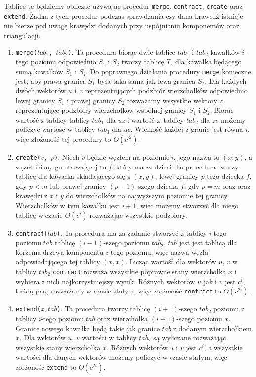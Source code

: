 \documentclass[twoside,a4paper,12pt]{report} %
\theoremstyle{break}
\begin{document}
Tablice te będziemy obliczać używając procedur \texttt{merge}, \texttt{contract}, \texttt{create} oraz \texttt{extend}. Żadna z tych procedur podczas sprawdzania czy dana krawędź istnieje nie bierze pod uwagę krawędzi dodanych przy uspójnianiu komponentów oraz triangulacji.
\begin{enumerate}
    \item \texttt{merge($tab_1$, $tab_2$)}. Ta procedura biorąc dwie tablice $tab_1$ i $tab_2$ kawałków $i$-tego poziomu odpowiednio $S_1$ i $S_2$ tworzy tablicę $T_3$ dla kawałka będącego sumą kawałków $S_1$ i $S_2$. Do poprawnego działania procedury \texttt{merge} konieczne jest, aby prawa granica $S_1$ była taka sama jak lewa granica $S_2$. Dla każdych dwóch wektorów $u$ i~$v$ reprezentujących podzbiór wierzchołków odpowiednio lewej granicy $S_1$ i prawej granicy $S_2$ rozważamy wszystkie wektory $z$ reprezentujące podzbiory wierzchołków wspólnej granicy $S_1$ i $S_2$. Biorąc wartość z tablicy tablicy $tab_1$ dla $uz$ i wartość z~tablicy $tab_2$ dla $zv$ możemy policzyć wartość w tablicy $tab_3$ dla $uv$. Wielkość każdej z granic jest równa $i$, więc złożoność tej procedury to $O(c^{3i})$.
    \item \texttt{create($v$, $p$)}. Niech $v$ będzie węzłem na poziomie $i$, jego nazwa to $(x,y)$, a węzeł ściany go otaczającej to $f$, który ma $m$ dzieci. Ta procedura tworzy tablicę dla kawałka składającego się z $(x,y)$, lewej granicy $p$-tego dziecka $f$, gdy $p < m$ lub prawej granicy $(p-1)$-szego dziecka $f$, gdy $p=m$ oraz oraz krawędzi z $x$ i $y$ do wierzchołków na najwyższym poziomie tej granicy. Wierzchołków w tym kawałku jest $i+1$, więc możemy stworzyć dla niego tablicę w czasie $O(c^i)$ rozważając wszystkie podzbiory.
    \item \texttt{contract($tab$)}. Ta procedura ma za zadanie stworzyć z tablicy $i$-tego poziomu $tab$ tablicę $(i-1)$-szego poziomu $tab_2$. $tab$ jest jest tablicą dla korzenia drzewa komponentu $i$-tego poziomu, więc nazwa węzła odpowiadającego tej tablicy $(x,x)$. Licząc wartość dla wektorów $u$, $v$ w tablicy $tab_2$ \texttt{contract} rozważa wszystkie poprawne stany wierzchołka $x$ i wybiera z nich najkorzystniejszy wynik. Różnych wektorów $u$ jak i $v$ jest $c^i$, każdą parę rozważamy w czasie stałym, więc złożoność \texttt{contract} to $O(c^{2i})$.
    \item \texttt{extend($x$,$tab$)}. Ta procedura tworzy tablicę $(i+1)$-szego $tab_2$ poziomu z tablicy $i$-tego poziomu $tab$ oraz wierzchołka $(i+1)$-szego poziomu $x$. Granice nowego kawałka będą takie jak granice $tab$ z dodanym wierzchołkiem $x$. Dla wektorów $u$, $v$ wartości w tablicy $tab_2$ są wyliczane rozważając wszystkie stany wierzchołka $x$. Różnych wektorów $u$ i $v$ jest $c^i$, a wszystkie wartości dla danych wektorów możemy policzyć w czasie stałym, więc złożoność \texttt{extend} to $O(c^{2i})$.

\end{enumerate}
\end{document}
